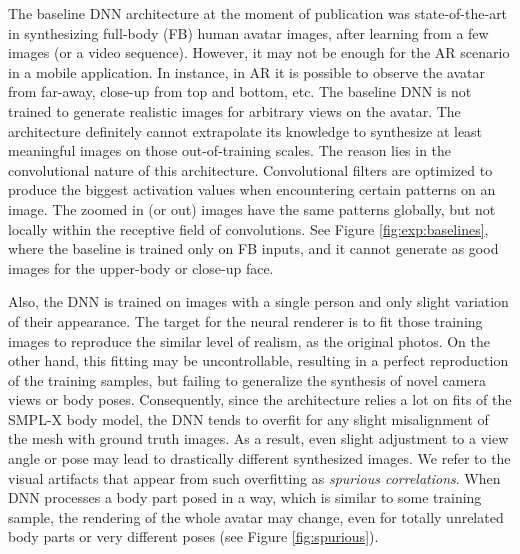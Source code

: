 
The baseline DNN architecture \cite{dnn:stylepeople21} at the moment of publication was state-of-the-art in synthesizing full-body (FB) human avatar images, after learning from a few images (or a video sequence). However, it may not be enough for the AR scenario in a mobile application. In instance, in AR it is possible to observe the avatar from far-away, close-up from top and bottom, etc. The baseline DNN is not trained to generate realistic images for arbitrary views on the avatar. The architecture definitely cannot extrapolate its knowledge to synthesize at least meaningful images on those out-of-training scales. The reason lies in the convolutional nature of this architecture. Convolutional filters are optimized to produce the biggest activation values when encountering certain patterns on an image. The zoomed in (or out) images have the same patterns globally, but not locally within the receptive field of convolutions. See Figure \ref{fig:exp:baselines}, where the baseline is trained only on FB inputs, and it cannot generate as good images for the upper-body or close-up face.

Also, the DNN is trained on images with a single person and only slight variation of their appearance. The target for the neural renderer is to fit those training images to reproduce the similar level of realism, as the original photos. On the other hand, this fitting may be uncontrollable, resulting in a perfect reproduction of the training samples, but failing to generalize the synthesis of novel camera views or body poses. Consequently, since the architecture relies a lot on fits of the SMPL-X body model, the DNN tends to overfit for any slight misalignment of the mesh with ground truth images. As a result, even slight adjustment to a view angle or pose may lead to drastically different synthesized images. We refer to the visual artifacts that appear from such overfitting as \textit{spurious correlations}. When DNN processes a body part posed in a way, which is similar to some training sample, the rendering of the whole avatar may change, even for totally unrelated body parts or very different poses (see Figure \ref{fig:spurious}).

